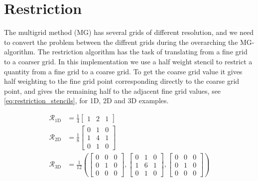 

\section{Restriction}
	\label{sec:restr_simple}
	The multigrid method (MG) has several grids of different resolution, and we need to
 	convert the problem between the diffrent grids during the overarching the MG-algorithm.
 	The restriction algorithm has the task of translating from a fine grid to a coarser grid.
	In this implementation we use a half weight stencil to restrict a quantity from a fine
	grid to a coarse grid. To get the coarse grid value it gives half weighting to
	the fine grid point corresponding directly to the coarse grid point, and gives the remaining
	half to the adjacent fine grid values, see \eqref{eq:restriction_stencils}, for 1D,
	2D and 3D examples.

	\begin{equation}
		\begin{aligned}
			\mathcal{R}_{1\text{D}} &= \frac{1}{4}
			\begin{bmatrix}
				1 & 2 & 1
			\end{bmatrix}
			\\
			\mathcal{R}_{2\text{D}} &= \frac{1}{8}
			\begin{bmatrix}
				0 & 1 & 0
				\\
				1 & 4 & 1
				\\
				0 & 1 & 0
			\end{bmatrix}
			\\
			\mathcal{R}_{3\text{D}} &= \frac{1}{12} \left(
			\begin{bmatrix}
				0 & 0 & 0
				\\
				0 & 1 & 0
				\\
				0 & 0 & 0
			\end{bmatrix}
			,
			\begin{bmatrix}
				0 & 1 & 0
				\\
				1 & 6 & 1
				\\
				0 & 1 & 0
			\end{bmatrix}
			,
			\begin{bmatrix}
				0 & 0 & 0
				\\
				0 & 1 & 0
				\\
				0 & 0 & 0
			\end{bmatrix}
			\right)
			\label{eq:restriction_stencils}
		\end{aligned}
	\end{equation}

